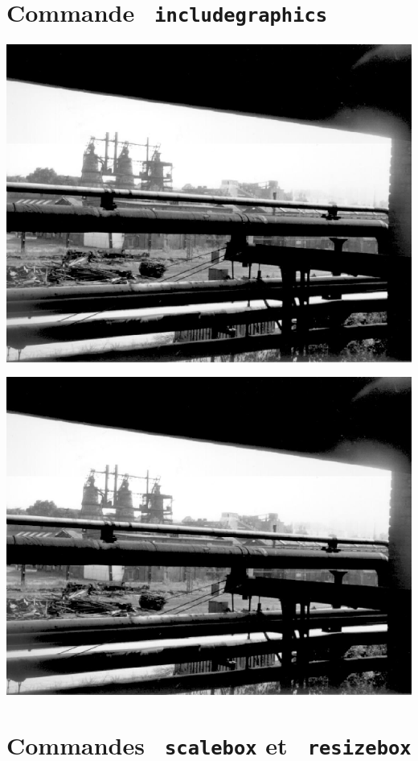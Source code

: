 \documentclass{article}
\begin{document}
\section{Commande \texttt{ includegraphics}}
\label{include}
\begin{center}
\includegraphics{HF.ps}
\end{center}

\includegraphics*[1cm,1cm]{HF.ps}
\label{autre}

\section{Commandes \texttt{ scalebox} et \texttt{ resizebox}}
\end{document}
